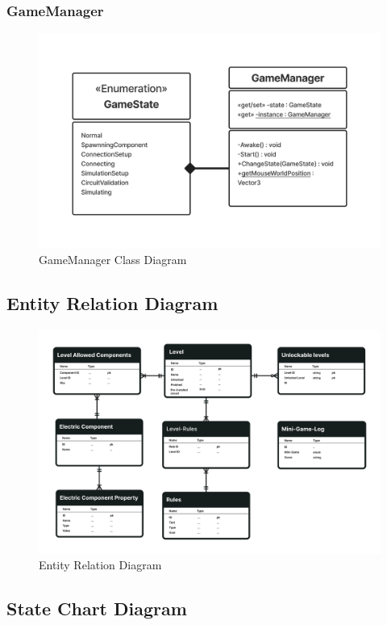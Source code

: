 \documentclass[../main.tex]{subfiles}
\begin{document}
\subsubsection{GameManager}\begin{figure}[h!]
\centering
\includegraphics[scale=0.3]{images/chapter3/Class3.png}
\caption{GameManager Class Diagram}
\label{GameManager }
\end{figure}
\vfill
\newpage
\subsection{Entity Relation Diagram }
\begin{figure}[h!]
\centering
\includegraphics[scale=0.15]{images/chapter3/ERD.png}
\caption{Entity Relation Diagram }
\label{Entity Relation Diagram }
\end{figure}
\vfill
\newpage

\subsection{State Chart Diagram}
\end{document}
